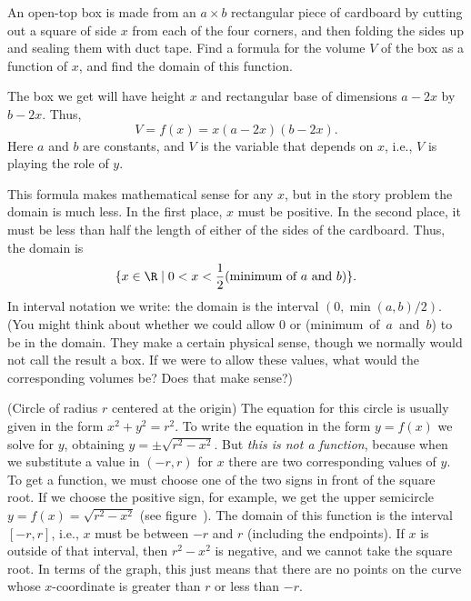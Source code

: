 \begin{example} An open-top box is made from an $a\times b$ rectangular piece of
 cardboard by cutting out a square of side $x$ from each of the four
 corners, and then folding the sides up and sealing them with duct
 tape.  Find a formula for the volume $V$ of the box as a function of
 $x$, and find the domain of this function.


The box we get will have height $x$ and rectangular base of
dimensions $a-2x$ by $b-2x$.  Thus, 
$$
     V=f(x)=x(a-2x)(b-2x).
$$
Here $a$ and $b$ are constants, and $V$ is the variable that depends
on $x$, i.e., $V$ is playing the role of $y$.  

This formula makes mathematical sense for any $x$, but in the story
problem the domain is much less.  In the first place, $x$ must be
positive.  In the second place, it must be less than half the length
of either of the sides of the cardboard.  Thus, the domain is
$$
 \{x\in\R\mid 0<x<{1\over2}(\hbox{minimum~of~$a$~and~$b$})\}.
$$
In interval notation we write: the domain is the interval
$(0,\min(a,b)/2)$. (You might think about whether we could allow 0 or 
(minimum~of~$a$~and~$b$) to be in the domain. They make a certain
physical sense, though we normally would not call the result a box. If we
were to allow these values, what would the corresponding volumes be?
Does that make sense?)
\end{example}

\begin{example} (Circle of radius $r$ centered at the origin) The equation for
this circle is usually given in the form $x^2+y^2=r^2$.  To write the
equation in the form $y=f(x)$ we solve for $y$, obtaining
$y=\pm\sqrt{r^2-x^2}$.  But {\it this is not a function}, because when
we substitute a value in $(-r,r)$ for $x$ there are two corresponding
values of $y$.
To get a function, we must choose one of the two signs in front of the
square root.  If we choose the positive sign, for example, we get the
upper semicircle $y=f(x)=\sqrt{r^2- x^2}$ (see figure~).  The domain of this function is the interval $[-r,r]$,
i.e., $x$ must be between $-r$ and $r$ (including the endpoints).  If
$x$ is outside of that interval, then $r^2-x^2$ is negative, and we
cannot take the square root.  In terms of the graph, this just means
that there are no points on the curve whose $x$-coordinate is greater
than $r$ or less than $-r$.
\end{example}


